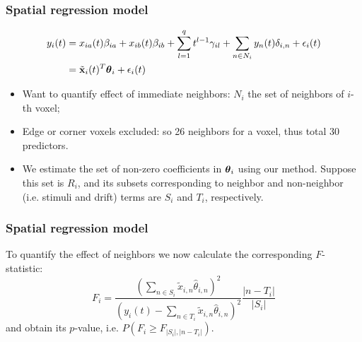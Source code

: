 \documentclass[handout,10pt]{beamer}
\begin{document}

\begin{frame}
\frametitle{Spatial regression model}
%
\begin{align*}
y_i(t) & = x_{ia}(t) \beta_{ia} + x_{ib}(t) \beta_{ib} + \sum_{l=1}^q t^{l-1} \gamma_{il} + \sum_{n \in N_i} y_n(t) \delta_{i,n} + \epsilon_i(t) \\
& = \tilde {{\bf{x}}}_i (t)^T {\boldsymbol{\theta}}_i + \epsilon_i (t)
\end{align*}
%

\begin{itemize}
\item Want to quantify effect of immediate neighbors: $N_i$ the set of neighbors of $i$-th voxel;

\vspace{1em}
\item Edge or corner voxels excluded: so 26 neighbors for a voxel, thus total 30 predictors.

\vspace{1em}
\item  We estimate the set of non-zero coefficients in ${\boldsymbol{\theta}}_i$ using our method. Suppose this set is $R_i$, and its subsets corresponding to neighbor and non-neighbor (i.e. stimuli and drift) terms are $S_i$ and $T_i$, respectively.
\end{itemize}

\end{frame}


\begin{frame}
\frametitle{Spatial regression model}
%
To quantify the effect of neighbors we now calculate the corresponding $F$-statistic:
%
$$
F_i = \frac{(\sum_{n \in S_i} \tilde x_{i,n} \hat\theta_{i,n})^2}{(y_i(t) - \sum_{n \in T_i} \tilde x_{i,n} \hat\theta_{i,n})^2} \frac{|n-T_i|}{|S_i|}
$$
and obtain its $p$-value, i.e. $P(F_i \geq F_{|S_i|,|n-T_i|})$.


\end{frame}

\end{document}
